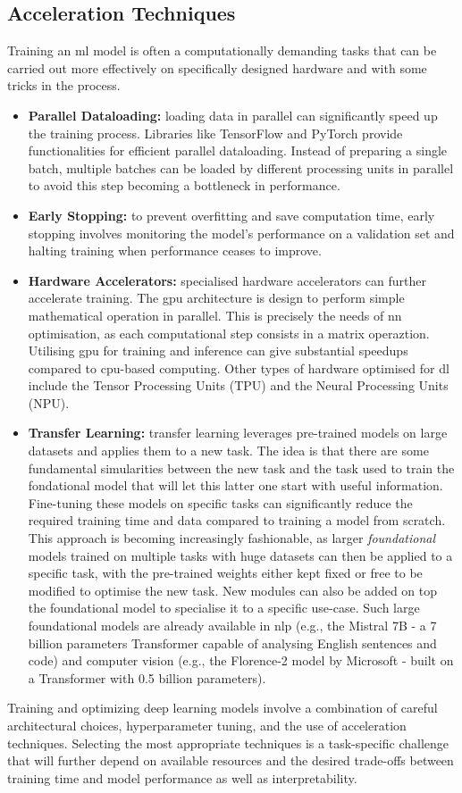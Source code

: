 \subsection{Acceleration Techniques}
Training an \gls{ml} model is often a computationally demanding tasks that can be carried out more effectively on specifically designed hardware and with some tricks in the process. 
\begin{itemize}
    \item \textbf{Parallel Dataloading:} loading data in parallel can significantly speed up the training process. Libraries like TensorFlow and PyTorch provide functionalities for efficient parallel dataloading. Instead of preparing a single batch, multiple batches can be loaded by different processing units in parallel to avoid this step becoming a bottleneck in performance. 
    \item \textbf{Early Stopping:} to prevent overfitting and save computation time, early stopping involves monitoring the model's performance on a validation set and halting training when performance ceases to improve.
    \item  \textbf{Hardware Accelerators:} specialised hardware accelerators can further accelerate training. The \gls{gpu} architecture is design to perform simple mathematical operation in parallel. This is precisely the needs of \gls{nn} optimisation, as each computational step consists in a matrix operaztion. Utilising \gls{gpu} for training and inference can give substantial speedups compared to \gls{cpu}-based computing. Other types of hardware optimised for \gls{dl} include the Tensor Processing Units (TPU) and the Neural Processing Units (NPU). 
    \item \textbf{Transfer Learning:} transfer learning leverages pre-trained models on large datasets and applies them to a new task. The idea is that there are some fundamental simularities between the new task and the task used to train the fondational model that will let this latter one start with useful information. Fine-tuning these models on specific tasks can significantly reduce the required training time and data compared to training a model from scratch. This approach is becoming increasingly fashionable, as larger \textit{foundational} models trained on multiple tasks with huge datasets can then be applied to a specific task, with the pre-trained weights either kept fixed or free to be modified to optimise the new task. New modules can also be added on top the foundational model to specialise it to a specific use-case. Such large foundational models are already available in \gls{nlp} (e.g., the Mistral 7B \cite{jiang2023mistral} - a 7 billion parameters Transformer capable of analysing English sentences and code) and computer vision (e.g., the Florence-2 model by Microsoft \cite{xiao2023florence2} - built on a Transformer with 0.5 billion parameters).
\end{itemize}
Training and optimizing deep learning models involve a combination of careful architectural choices, hyperparameter tuning, and the use of acceleration techniques. Selecting the most appropriate techniques is a task-specific challenge that will further depend on available resources and the desired trade-offs between training time and model performance as well as interpretability.
